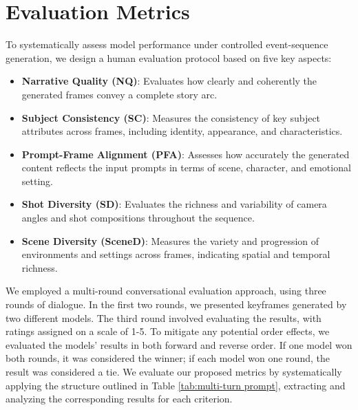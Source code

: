 \newpage
\appendix

\section{Evaluation Metrics}
\label{app:metrics}
To systematically assess model performance under controlled event-sequence generation, we design a human evaluation protocol based on five key aspects:

\begin{itemize}[leftmargin=*]
    \item \textbf{Narrative Quality (NQ)}: Evaluates how clearly and coherently the generated frames convey a complete story arc.
    \item \textbf{Subject Consistency (SC)}: Measures the consistency of key subject attributes across frames, including identity, appearance, and characteristics.
    \item \textbf{Prompt-Frame Alignment (PFA)}: Assesses how accurately the generated content reflects the input prompts in terms of scene, character, and emotional setting.
    \item \textbf{Shot Diversity (SD)}: Evaluates the richness and variability of camera angles and shot compositions throughout the sequence.
    \item \textbf{Scene Diversity (SceneD)}: Measures the variety and progression of environments and settings across frames, indicating spatial and temporal richness.
\end{itemize}

We employed a multi-round conversational evaluation approach, using three rounds of dialogue. In the first two rounds, we presented keyframes generated by two different models. The third round involved evaluating the results, with ratings assigned on a scale of 1-5. To mitigate any potential order effects, we evaluated the models' results in both forward and reverse order. If one model won both rounds, it was considered the winner; if each model won one round, the result was considered a tie. We evaluate our proposed metrics by systematically applying the structure outlined in Table \ref{tab:multi-turn prompt}, extracting and analyzing the corresponding results for each criterion.





